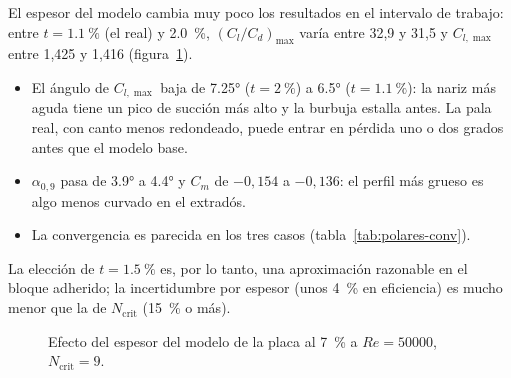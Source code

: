 El espesor del modelo cambia muy poco los resultados en el intervalo de trabajo: entre
$t=\SI{1.1}{\percent}$ (el real) y \SI{2.0}{\percent}, $(C_l/C_d)_{\max}$ varía entre
32,9 y 31,5 y $C_{l,\max}$ entre 1,425 y 1,416 (figura~\ref{fig:polares-espesor}).
\begin{itemize}
  \item El ángulo de $C_{l,\max}$ baja de \ang{7.25} ($t=\SI{2}{\percent}$) a \ang{6.5}
        ($t=\SI{1.1}{\percent}$): la nariz más aguda tiene un pico de succión más alto y la
        burbuja estalla antes. La pala real, con canto menos redondeado, puede entrar en
        pérdida uno o dos grados antes que el modelo base.
  \item $\alpha_{0,9}$ pasa de \ang{3.9} a \ang{4.4} y $C_m$ de $-0{,}154$ a $-0{,}136$: el
        perfil más grueso es algo menos curvado en el extradós.
  \item La convergencia es parecida en los tres casos (tabla~\ref{tab:polares-conv}).
\end{itemize}
La elección de $t=\SI{1.5}{\percent}$ es, por lo tanto, una aproximación razonable en el
bloque adherido; la incertidumbre por espesor (unos \SI{4}{\percent} en eficiencia) es
mucho menor que la de $N_{\text{crit}}$ (\SI{15}{\percent} o más).

\begin{figure}[H]
\centering
{}\hfill
{}
\caption{Efecto del espesor del modelo de la placa al \SI{7}{\percent} a $Re=\num{50000}$,
$N_{\text{crit}}=9$.}
\label{fig:polares-espesor}
\end{figure}

